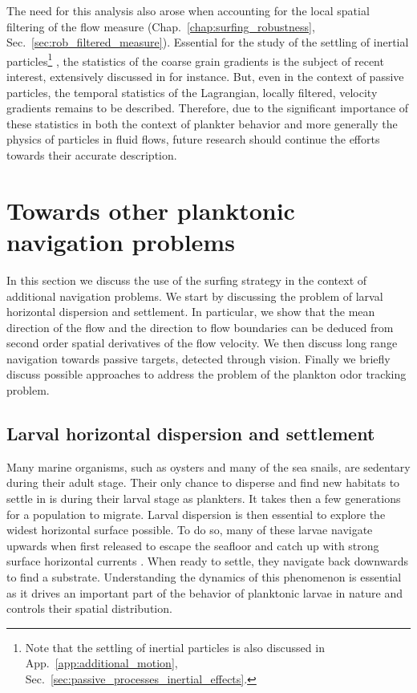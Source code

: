The need for this analysis also arose when accounting for the local spatial filtering of the flow measure (Chap.~\ref{chap:surfing_robustness}, Sec.~\ref{sec:rob_filtered_measure}).
Essential for the study of the settling of inertial particles\footnote{Note that the settling of inertial particles is also discussed in App.~\ref{app:additional_motion}, Sec.~\ref{sec:passive_processes_inertial_effects}.} \citep{maxey1986gravitational, tom2019multiscale}, the statistics of the coarse grain gradients is the subject of recent interest, extensively discussed in \citet{tom2022investigation} for instance.
But, even in the context of passive particles, the temporal statistics of the Lagrangian, locally filtered, velocity gradients remains to be described.
Therefore, due to the significant importance of these statistics in both the context of plankter behavior and more generally the physics of particles in fluid flows, future research should continue the efforts towards their accurate description.

\section{Towards other planktonic navigation problems}\label{sec:additional_navigation}

In this section we discuss the use of the surfing strategy in the context of additional navigation problems. 
We start by discussing the problem of larval horizontal dispersion and settlement.
In particular, we show that the mean direction of the flow and the direction to flow boundaries can be deduced from second order spatial derivatives of the flow velocity.
We then discuss long range navigation towards passive targets, detected through vision.
Finally we briefly discuss possible approaches to address the problem of the plankton odor tracking problem.

\subsection{Larval horizontal dispersion and settlement}\label{sec:horizontal_dispersion}

Many marine organisms, such as oysters and many of the sea snails, are sedentary during their adult stage.
Their only chance to disperse and find new habitats to settle in is during their larval stage as plankters.
It takes then a few generations for a population to migrate.
Larval dispersion is then essential to explore the widest horizontal surface possible.
To do so, many of these larvae navigate upwards when first released to escape the seafloor and catch up with strong surface horizontal currents \citep{mcedward2020ecology, welch2001flood, kingsford2002sensory}.
When ready to settle, they navigate back downwards to find a substrate.
Understanding the dynamics of this phenomenon is essential as it drives an important part of the behavior of planktonic larvae in nature and controls their spatial distribution.


